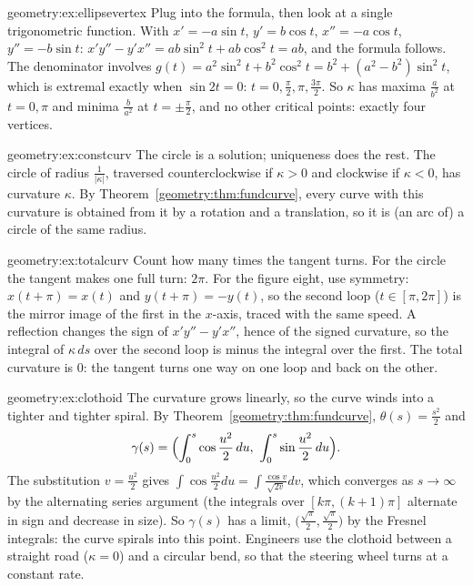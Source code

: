 \begin{solution}{geometry:ex:ellipsevertex}
\idea Plug into the formula, then look at a single trigonometric function.
\writeup With $x'=-a\sin t$, $y'=b\cos t$, $x''=-a\cos t$, $y''=-b\sin t$: $x'y''-y'x''=ab\sin^2t+ab\cos^2t=ab$, and the formula follows. The denominator involves
$g(t)=a^2\sin^2t+b^2\cos^2t=b^2+(a^2-b^2)\sin^2t$, which is extremal exactly when $\sin2t=0$: $t=0,\frac\pi2,\pi,\frac{3\pi}2$. So $\kappa$ has maxima $\frac a{b^2}$ at
$t=0,\pi$ and minima $\frac b{a^2}$ at $t=\pm\frac\pi2$, and no other critical points: exactly four vertices.
\end{solution}

\begin{solution}{geometry:ex:constcurv}
\idea The circle is a solution; uniqueness does the rest.
\writeup The circle of radius $\frac1{|\kappa|}$, traversed counterclockwise if $\kappa>0$ and clockwise if $\kappa<0$, has curvature $\kappa$. By Theorem~\ref{geometry:thm:fundcurve},
every curve with this curvature is obtained from it by a rotation and a translation, so it is (an arc of) a circle of the same radius.
\end{solution}

\begin{solution}{geometry:ex:totalcurv}
\idea Count how many times the tangent turns.
\writeup For the circle the tangent makes one full turn: $2\pi$. For the figure eight, use symmetry: $x(t+\pi)=x(t)$ and $y(t+\pi)=-y(t)$, so the second loop
($t\in[\pi,2\pi]$) is the mirror image of the first in the $x$-axis, traced with the same speed. A reflection changes the sign of $x'y''-y'x''$, hence of the signed curvature,
so the integral of $\kappa\,ds$ over the second loop is minus the integral over the first. The total curvature is $0$: the tangent turns one way on one loop and back on the other.
\end{solution}

\begin{solution}{geometry:ex:clothoid}
\idea The curvature grows linearly, so the curve winds into a tighter and tighter spiral.
\writeup By Theorem~\ref{geometry:thm:fundcurve}, $\theta(s)=\frac{s^2}2$ and
\[\gamma(s)=\Bigl(\int_0^s\cos\frac{u^2}2\,du,\ \int_0^s\sin\frac{u^2}2\,du\Bigr).\]
The substitution $v=\frac{u^2}2$ gives
$\int\cos\frac{u^2}2du=\int\frac{\cos v}{\sqrt{2v}}dv$, which converges as $s\to\infty$ by the alternating series argument (the integrals over $[k\pi,(k+1)\pi]$ alternate in sign and
decrease in size). So $\gamma(s)$ has a limit, $\bigl(\frac{\sqrt\pi}2,\frac{\sqrt\pi}2\bigr)$ by the Fresnel integrals: the curve spirals into this point. Engineers use the
clothoid between a straight road ($\kappa=0$) and a circular bend, so that the steering wheel turns at a constant rate.
\end{solution}

